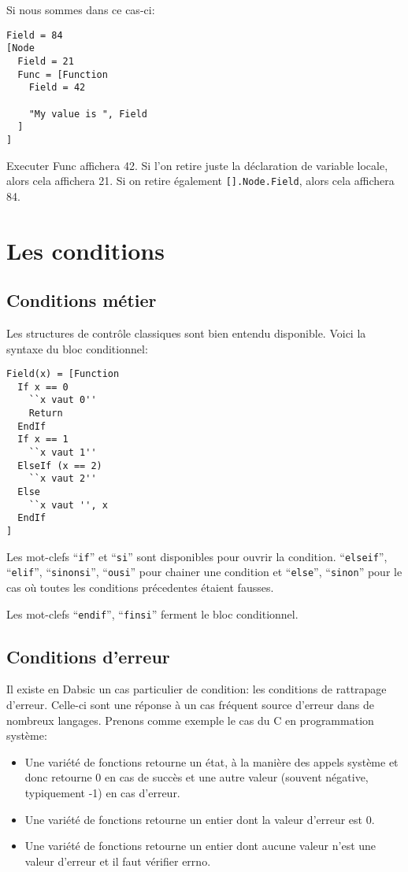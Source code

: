 \documentclass[a5paper, 12pt]{book}
\begin{document}
Si nous sommes dans ce cas-ci:\\

\begin{verbatim}
Field = 84
[Node
  Field = 21
  Func = [Function
    Field = 42

    "My value is ", Field
  ]
]
\end{verbatim}

Executer Func affichera 42. Si l'on retire juste la
déclaration de variable locale, alors cela affichera 21.
Si on retire également \verb![].Node.Field!, alors cela affichera
84.
    
\section{Les conditions}

\subsection{Conditions métier}

Les structures de contrôle classiques sont bien entendu
disponible. Voici la syntaxe du bloc conditionnel:\\

\begin{verbatim}
Field(x) = [Function
  If x == 0
    ``x vaut 0''
    Return
  EndIf
  If x == 1
    ``x vaut 1''
  ElseIf (x == 2)
    ``x vaut 2''
  Else
    ``x vaut '', x
  EndIf
]
\end{verbatim}

Les mot-clefs ``\verb!if!'' et ``\verb!si!'' sont disponibles pour
ouvrir la condition. ``\verb!elseif!'', ``\verb!elif!'', ``\verb!sinonsi!'',
``\verb!ousi!'' pour chainer une condition et ``\verb!else!'', ``\verb!sinon!''
pour le cas où toutes les conditions précedentes étaient
fausses.

Les mot-clefs ``\verb!endif!'', ``\verb!finsi!'' ferment le bloc
conditionnel.

\subsection{Conditions d'erreur}

Il existe en Dabsic un cas particulier de condition:
les conditions de rattrapage d'erreur. Celle-ci sont
une réponse à un cas fréquent source d'erreur dans de
nombreux langages.
Prenons comme exemple le cas du C en programmation système:

\begin{itemize}
  \item Une variété de fonctions retourne un état,
    à la manière des appels système et donc retourne 0 en
    cas de succès et une autre valeur (souvent négative,
    typiquement -1) en cas d'erreur.
  \item Une variété de fonctions retourne un entier
    dont la valeur d'erreur est 0.
  \item Une variété de fonctions retourne un entier
    dont aucune valeur n'est une valeur d'erreur
    et il faut vérifier errno.
\end{itemize}
\end{document}
